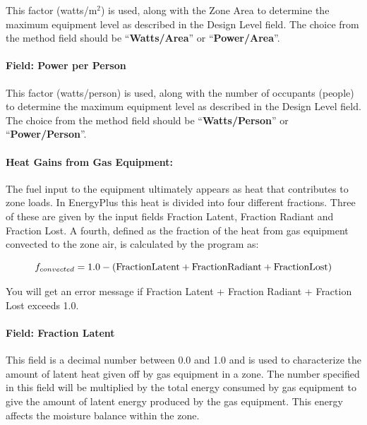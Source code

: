 This factor (watts/m\(^{2}\)) is used, along with the Zone Area to determine the maximum equipment level as described in the Design Level field. The choice from the method field should be ``\textbf{Watts/Area}'' or ``\textbf{Power/Area}''.

\paragraph{Field: Power per Person}\label{field-power-per-person}

This factor (watts/person) is used, along with the number of occupants (people) to determine the maximum equipment level as described in the Design Level field. The choice from the method field should be ``\textbf{Watts/Person}'' or ``\textbf{Power/Person}''.

\paragraph{Heat Gains from Gas Equipment:}\label{heat-gains-from-gas-equipment}

The fuel input to the equipment ultimately appears as heat that contributes to zone loads. In EnergyPlus this heat is divided into four different fractions. Three of these are given by the input fields Fraction Latent, Fraction Radiant and Fraction Lost. A fourth, defined as the fraction of the heat from gas equipment convected to the zone air, is calculated by the program as:

\begin{equation}
  f_{convected} = 1.0 - (\rm{Fraction Latent} + \rm{Fraction Radiant} + \rm{Fraction Lost})
\end{equation}

You will get an error message if Fraction Latent + Fraction Radiant + Fraction Lost exceeds 1.0.

\paragraph{Field: Fraction Latent}\label{field-fraction-latent-1}

This field is a decimal number between 0.0 and 1.0 and is used to characterize the amount of latent heat given off by gas equipment in a zone. The number specified in this field will be multiplied by the total energy consumed by gas equipment to give the amount of latent energy produced by the gas equipment. This energy affects the moisture balance within the zone.

